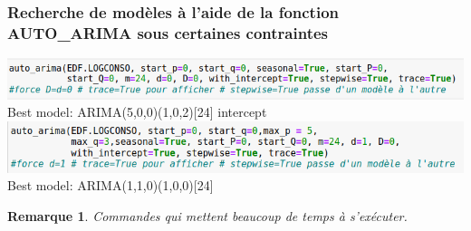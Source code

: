 \documentclass{beamer}
\newtheorem{rmq}{Remarque}
\theoremstyle{definition}
\begin{document}
\begin{frame}
	\frametitle{Recherche de modèles à l'aide de la fonction AUTO\_ARIMA sous certaines contraintes}
	\begin{minipage}[t]{1\linewidth}
		\centering

		\includegraphics[width=1\linewidth]{13.png}\\
		
		Best model:  ARIMA(5,0,0)(1,0,2)[24] intercept\\[0.5cm]
		
		\includegraphics[width=1\linewidth]{14.png}\\
		Best model:  ARIMA(1,1,0)(1,0,0)[24]\\[1cm]          
	\end{minipage}
	\begin{rmq}
		Commandes qui mettent beaucoup de temps à s'exécuter.
	\end{rmq}
\end{frame}
\end{document}
